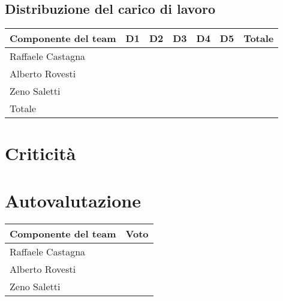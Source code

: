 \documentclass[11pt, a4paper]{article}
\theoremstyle{definition}
\begin{document}
\subsection{Distribuzione del carico di lavoro}
\begin{center}
  \footnotesize
  \begin{tabularx}{\textwidth}{|X||c||c||c||c||c||c|}
      \hline
      \cellcolor{red!70}Componente del team & \cellcolor{red!70}D1 & \cellcolor{red!70}D2 & \cellcolor{red!70}D3 & \cellcolor{red!70}D4 & \cellcolor{red!70}D5 & \cellcolor{red!70}Totale\\
      \hline
      Raffaele Castagna & &&&&&\\
      \hline
      Alberto Rovesti & &&&&&\\
      \hline
      Zeno Saletti & &&&&&\\
      \hline
      \cellcolor{red!70}Totale & &&&&&\\
      \hline
  \end{tabularx}
\end{center}

\section{Criticità}
\section{Autovalutazione}
\begin{center}
  \footnotesize
  \begin{tabularx}{\columnwidth}{|X||c|}
      \hline
      \cellcolor{red!70}Componente del team & \cellcolor{red!70}Voto\\
      \hline
      Raffaele Castagna & \\
      \hline
      Alberto Rovesti & \\
      \hline
      Zeno Saletti & \\
      \hline
  \end{tabularx}
\end{center}
\end{document}
